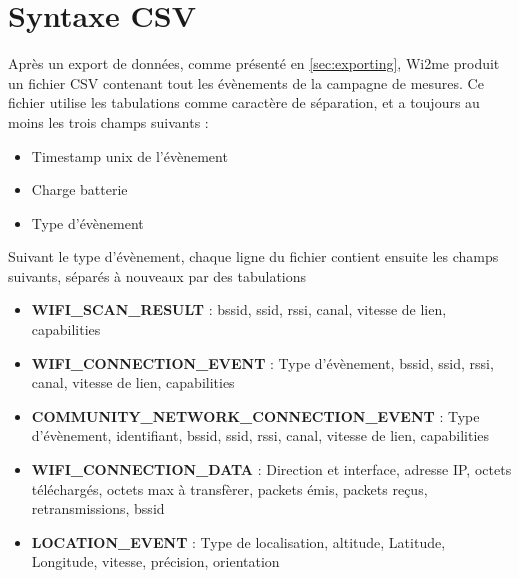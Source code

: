\documentclass[11pt]{article}
\newcommand\mtext[2]{#1}
\newcommand\mtext[2]{#2}
\begin{document}
\section{\mtext{Syntaxe CSV}{Wi2Me CSV Syntax}}

\mtext{Après un export de données, comme présenté en \ref{sec:exporting}, Wi2me
produit un fichier CSV contenant tout les évènements de la campagne de mesures.
Ce fichier utilise les tabulations comme caractère de séparation, et a toujours
au moins les trois champs suivants : 
}{}
\begin{itemize}
\item \mtext{Timestamp unix de l'évènement}{ Unix Timestamp of the event}
\item \mtext{Charge batterie}{Battery level}
\item \mtext{Type d'évènement}{Event type}
\end{itemize}

\mtext{Suivant le type d'évènement, chaque ligne du fichier contient ensuite les
champs suivants, séparés à nouveaux par des tabulations}{}

\begin{itemize}
\item \textbf{WIFI\_SCAN\_RESULT} : bssid, ssid, rssi, canal, vitesse de lien, capabilities
\item \textbf{WIFI\_CONNECTION\_EVENT} : Type d'évènement, bssid, ssid, rssi, canal, vitesse de lien, capabilities
\item \textbf{COMMUNITY\_NETWORK\_CONNECTION\_EVENT} : Type d'évènement, identifiant, bssid, ssid, rssi, canal, vitesse de lien, capabilities
\item \textbf{WIFI\_CONNECTION\_DATA} : Direction et interface, adresse IP, octets
téléchargés, octets max à transfèrer, packets émis, packets reçus, retransmissions, bssid
\item \textbf{LOCATION\_EVENT} : Type de localisation, altitude, Latitude, Longitude, vitesse, précision, orientation
\end{itemize}
\end{document}
